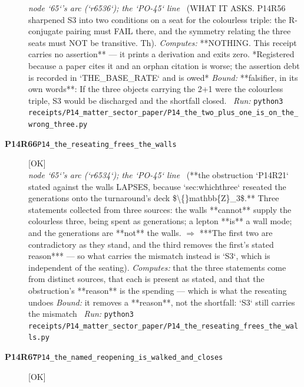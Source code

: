 \begin{description}
\textit{node `65`'s arc (`r6536`); the `PO-45` line} \ (WHAT IT ASKS. P14R56 sharpened S3 into two conditions on a seat for the colourless triple: the R-conjugate pairing must FAIL there, and the symmetry relating the three seats must NOT be transitive. Th). 
\emph{Computes:}  **NOTHING. This receipt carries no assertion** --- it prints a derivation and exits zero. *Registered because a paper cites it and an orphan citation is worse; the assertion debt is recorded in `THE\_BASE\_RATE` and is owed*
 \emph{Bound:} **falsifier, in its own words**: If the three objects carrying the 2+1 were the colourless triple, S3 would be discharged and the shortfall closed.
\ \emph{Run:} \texttt{python3 receipts/P14\_matter\_sector\_paper/P14\_the\_two\_plus\_one\_is\_on\_the\_wrong\_three.py}
\item[\rcptlabel{P14_the_reseating_frees_the_walls}{P14R66}\textbf{P14R66}\quad\texttt{P14\_the\_reseating\_frees\_the\_walls}]\hfill\textsf{[OK]}\\
\textit{node `65`'s arc (`r6534`); the `PO-45` line} \ (**the obstruction `P14R21` stated against the walls LAPSES, because `sec:whichthree` reseated the generations onto the turnaround's deck \$\textbackslash\{\}mathbb\{Z\}\_3\$.** Three statements collected from three sources: the walls **cannot** supply the colourless three, being spent as generations; a lepton **is** a wall mode; and the generations are **not** the walls. \ensuremath{\Rightarrow} ***The first two are contradictory as they stand, and the third removes the first's stated reason*** --- so what carries the mismatch instead is `S3`, which is independent of the seating). 
\emph{Computes:} that the three statements come from distinct sources, that each is present as stated, and that the obstruction's **reason** is the spending --- which is what the reseating undoes
 \emph{Bound:}  it removes a **reason**, not the shortfall: `S3` still carries the mismatch
\ \emph{Run:} \texttt{python3 receipts/P14\_matter\_sector\_paper/P14\_the\_reseating\_frees\_the\_walls.py}
\item[\rcptlabel{P14_the_named_reopening_is_walked_and_closes}{P14R67}\textbf{P14R67}\quad\texttt{P14\_the\_named\_reopening\_is\_walked\_and\_closes}]\hfill\textsf{[OK]}\\

\end{description}
